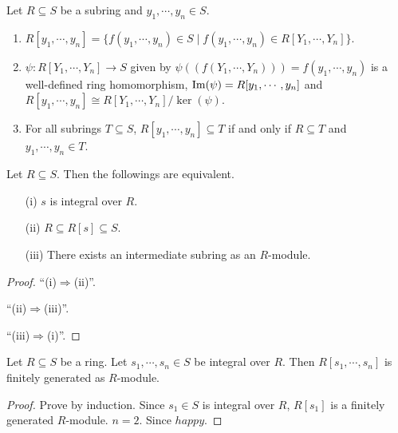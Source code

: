 \begin{fact}
    Let $R \subseteq S$ be a subring and $y_1,\cdots,y_n \in S$.
    \begin{enumerate}
        \item $R[y_1,\cdots,y_n] = \{f(y_1,\cdots,y_n) \in S \mid f(y_1,\cdots,y_n) \in R[Y_1,\cdots,Y_n]\}$.
        \item $\psi: R[Y_1,\cdots,Y_n] \to S$ given by $\psi((f(Y_1,\cdots,Y_n))) = f(y_1,\cdots,y_n)$ is a well-defined ring homomorphism, $\operatorname{Im}(\psi) = R[y_1,\cdots,y_n]$ and $R[y_1,\cdots,y_n] \cong R[Y_1,\cdots,Y_n]/\ker(\psi)$.
        \item For all subrings $T \subseteq S$, $R[y_1,\cdots,y_n] \subseteq T$ if and only if $R \subseteq T$ and $y_1,\cdots,y_n \in T$.
    \end{enumerate}
\end{fact}

\begin{example}
\end{example}

\begin{proposition}
    Let $R \subseteq S$. Then the followings are equivalent. 
    \begin{enumerate}
        \item[(i)] $s$ is integral over $R$.
        \item[(ii)] $R \subseteq R[s] \subseteq S$.
        \item[(iii)] There exists an intermediate subring as an $R$-module.
    \end{enumerate}
\end{proposition}

\begin{proof}
    ``(i)$\Rightarrow$(ii)''. \par 
    ``(ii)$\Rightarrow$(iii)''. \par 
    ``(iii)$\Rightarrow$(i)''. 
\end{proof}

\begin{theorem}
    Let $R \subseteq S$ be a ring. Let $s_1,\cdots,s_n \in S$ be integral over $R$. Then $R[s_1,\cdots,s_n]$ is finitely generated as $R$-module.
\end{theorem}

\begin{proof}
    Prove by induction. Since $s_1 \in S$ is integral over $R$, $R[s_1]$ is a finitely generated $R$-module. $n = 2$.
    Since $happy$.
\end{proof}


